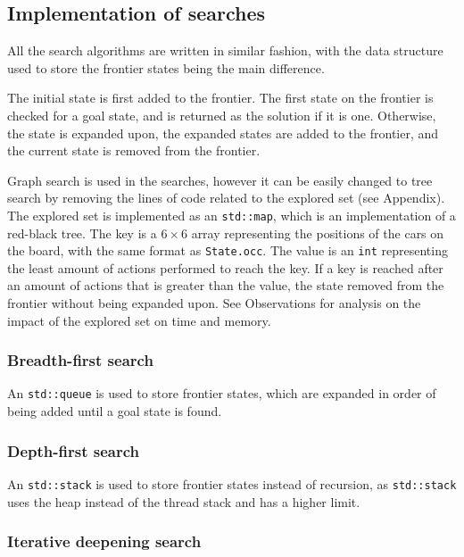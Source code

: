 \documentclass[12pt, a4paper]{article}
\begin{document}
\subsection{Implementation of searches}

All the search algorithms are written in similar fashion, with the data structure used to store the frontier states being the main difference.

The initial state is first added to the frontier. The first state on the frontier is checked for a goal state, and is returned as the solution if it is one. Otherwise, the state is expanded upon, the expanded states are added to the frontier, and the current state is removed from the frontier. 

Graph search is used in the searches, however it can be easily changed to tree search by removing the lines of code related to the explored set (see Appendix). The explored set is implemented as an {\tt std::map}, which is an implementation of a red-black tree. The key is a $6\times6$ array representing the positions of the cars on the board, with the same format as {\tt State.occ}. The value is an {\tt int} representing the least amount of actions performed to reach the key. If a key is reached after an amount of actions that is greater than the value, the state removed from the frontier without being expanded upon. See Observations for analysis on the impact of the explored set on time and memory.

\subsubsection{Breadth-first search}

An {\tt std::queue} is used to store frontier states, which are expanded in order of being added until a goal state is found.

\subsubsection{Depth-first search}

An {\tt std::stack} is used to store frontier states instead of recursion, as {\tt std::stack} uses the heap instead of the thread stack and has a higher limit. 

\subsubsection{Iterative deepening search}
\end{document}

